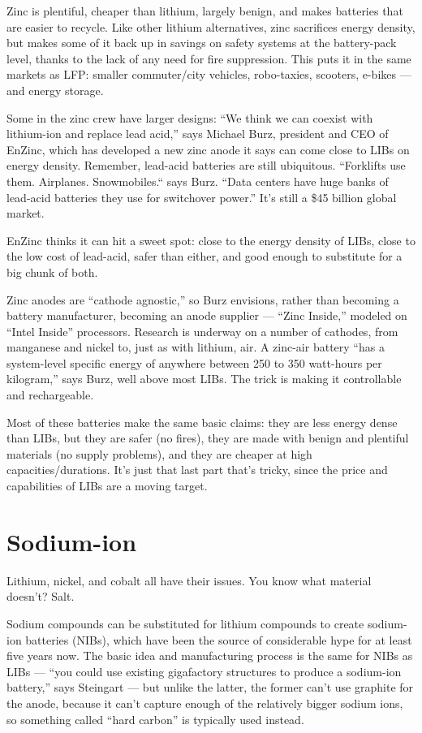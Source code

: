 \documentclass[
]{book}
\begin{document}
Zinc is plentiful, cheaper than lithium, largely benign, and makes batteries that are easier to recycle. Like other lithium alternatives, zinc sacrifices energy density, but makes some of it back up in savings on safety systems at the battery-pack level, thanks to the lack of any need for fire suppression. This puts it in the same markets as LFP: smaller commuter/city vehicles, robo-taxies, scooters, e-bikes --- and energy storage.

Some in the zinc crew have larger designs: ``We think we can coexist with lithium-ion and replace lead acid,'' says Michael Burz, president and CEO of EnZinc, which has developed a new zinc anode it says can come close to LIBs on energy density. Remember, lead-acid batteries are still ubiquitous. ``Forklifts use them. Airplanes. Snowmobiles.`` says Burz. ``Data centers have huge banks of lead-acid batteries they use for switchover power.'' It's still a \$45 billion global market.

EnZinc thinks it can hit a sweet spot: close to the energy density of LIBs, close to the low cost of lead-acid, safer than either, and good enough to substitute for a big chunk of both.

Zinc anodes are ``cathode agnostic,'' so Burz envisions, rather than becoming a battery manufacturer, becoming an anode supplier --- ``Zinc Inside,'' modeled on ``Intel Inside'' processors. Research is underway on a number of cathodes, from manganese and nickel to, just as with lithium, air. A zinc-air battery ``has a system-level specific energy of anywhere between 250 to 350 watt-hours per kilogram,'' says Burz, well above most LIBs. The trick is making it controllable and rechargeable.

Most of these batteries make the same basic claims: they are less energy dense than LIBs, but they are safer (no fires), they are made with benign and plentiful materials (no supply problems), and they are cheaper at high capacities/durations. It's just that last part that's tricky, since the price and capabilities of LIBs are a moving target.

\hypertarget{sodium-ion}{%
\section{Sodium-ion}\label{sodium-ion}}

Lithium, nickel, and cobalt all have their issues. You know what material doesn't? Salt.

Sodium compounds can be substituted for lithium compounds to create sodium-ion batteries (NIBs), which have been the source of considerable hype for at least five years now. The basic idea and manufacturing process is the same for NIBs as LIBs --- ``you could use existing gigafactory structures to produce a sodium-ion battery,'' says Steingart --- but unlike the latter, the former can't use graphite for the anode, because it can't capture enough of the relatively bigger sodium ions, so something called ``hard carbon'' is typically used instead.
\end{document}
